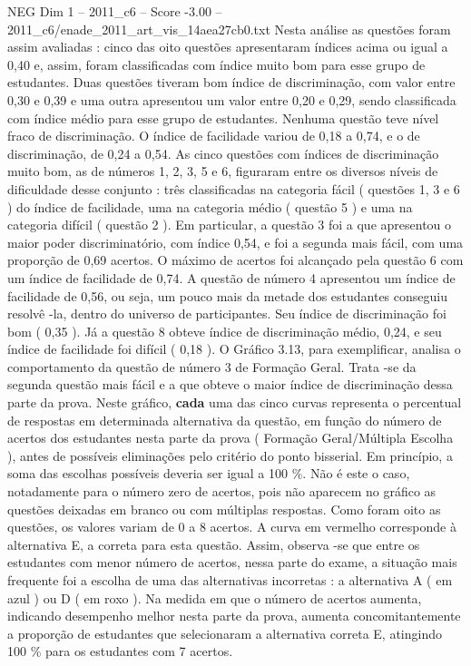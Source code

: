 \begin{textsample}{NEG Dim 1 – 2011\_c6 – Score -3.00 – 2011\_c6/enade\_2011\_art\_vis\_14aea27cb0.txt}
Nesta análise as questões foram assim avaliadas : cinco das oito questões apresentaram índices acima ou igual a 0,40 e, assim, foram classificadas com índice muito bom para esse grupo de estudantes.
Duas questões tiveram bom índice de discriminação, com valor entre 0,30 e 0,39 e uma outra apresentou um valor entre 0,20 e 0,29, sendo classificada com índice médio para esse grupo de estudantes.
Nenhuma questão teve nível fraco de discriminação.
O índice de facilidade variou de 0,18 a 0,74, e o de discriminação, de 0,24 a 0,54.
As cinco questões com índices de discriminação muito bom, as de números 1, 2, 3, 5 e 6, figuraram entre os diversos níveis de dificuldade desse conjunto : três classificadas na categoria fácil ( questões 1, 3 e 6 ) do índice de facilidade, uma na categoria médio ( questão 5 ) e uma na categoria difícil ( questão 2 ).
Em particular, a questão 3 foi a que apresentou o maior poder discriminatório, com índice 0,54, e foi a segunda mais fácil, com uma proporção de 0,69 acertos.
O máximo de acertos foi alcançado pela questão 6 com um índice de facilidade de 0,74.
A questão de número 4 apresentou um índice de facilidade de 0,56, ou seja, um pouco mais da metade dos estudantes conseguiu resolvê -la, dentro do universo de participantes.
Seu índice de discriminação foi bom ( 0,35 ).
Já a questão 8 obteve índice de discriminação médio, 0,24, e seu índice de facilidade foi difícil ( 0,18 ).
O Gráfico 3.13, para exemplificar, analisa o comportamento da questão de número 3 de Formação Geral.
Trata -se da segunda questão mais fácil e a que obteve o maior índice de discriminação dessa parte da prova.
Neste gráfico, \textbf{cada} uma das cinco curvas representa o percentual de respostas em determinada alternativa da questão, em função do número de acertos dos estudantes nesta parte da prova ( Formação Geral/Múltipla Escolha ), antes de possíveis eliminações pelo critério do ponto bisserial.
Em princípio, a soma das escolhas possíveis deveria ser igual a 100 \%.
Não é este o caso, notadamente para o número zero de acertos, pois não aparecem no gráfico as questões deixadas em branco ou com múltiplas respostas.
Como foram oito as questões, os valores variam de 0 a 8 acertos.
A curva em vermelho corresponde à alternativa E, a correta para esta questão.
Assim, observa -se que entre os estudantes com menor número de acertos, nessa parte do exame, a situação mais frequente foi a escolha de uma das alternativas incorretas : a alternativa A ( em azul ) ou D ( em roxo ).
Na medida em que o número de acertos aumenta, indicando desempenho melhor nesta parte da prova, aumenta concomitantemente a proporção de estudantes que selecionaram a alternativa correta E, atingindo 100 \% para os estudantes com 7 acertos.

\end{textsample}

